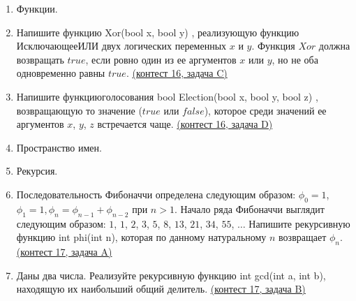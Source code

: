 \documentclass[a4paper,12pt]{article}
\begin{document}
\begin{enumerate}
\item Функции.
\item Напишите функцию Xor(bool x, bool y) {}, реализующую функцию $Исключающее ИЛИ$ двух логических переменных $x$ и $y$. Функция $Xor$ должна возвращать $true$, если ровно один из ее аргументов $x$ или $y$, но не оба одновременно равны $true$. \href{https://informatics.msk.ru/mod/statements/view3.php?chapterid=308}{(контест 16, задача C)}
\item Напишите $функцию голосования$ bool Election(bool x, bool y, bool z) {}, возвращающую то значение ($true$ или $false$), которое среди значений ее аргументов $x$, $y$, $z$ встречается чаще. \href{https://informatics.msk.ru/mod/statements/view3.php?chapterid=309}{(контест 16, задача D)}
\item Пространство имен.
\item Рекурсия.
\item Последовательность Фибоначчи определена следующим образом: $\phi_0=1$, $\phi_1=1, \phi_n=\phi_{n-1}+\phi_{n-2}$ при $n>1$. Начало ряда Фибоначчи выглядит следующим образом: $1$, $1$, $2$, $3$, $5$, $8$, $13$, $21$, $34$, $55$, $\dots$ Напишите рекурсивную функцию int phi(int n), которая по данному натуральному $n$ возвращает $\phi_n$. \href{https://informatics.msk.ru/mod/statements/view3.php?chapterid=312}{(контест 17, задача A)}
\item Даны два числа. Реализуйте рекурсивную функцию int gcd(int a, int b), находящую их наибольший общий делитель. \href{https://informatics.msk.ru/mod/statements/view3.php?chapterid=199}{(контест 17, задача B)}
\end{enumerate}
\end{document}
